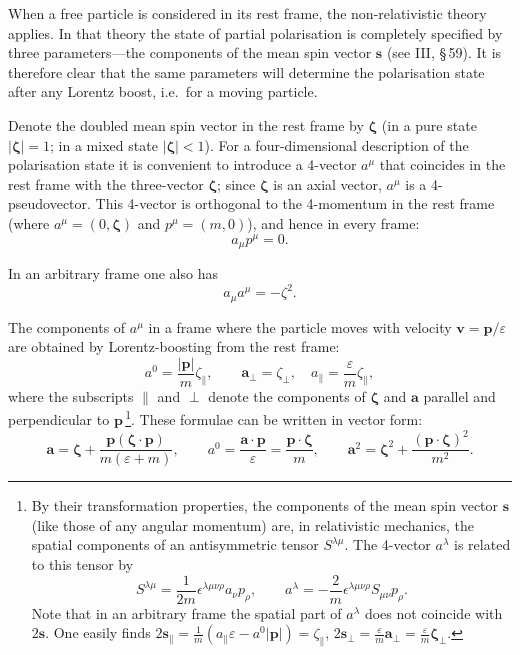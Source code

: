 When a free particle is considered in its rest frame, the non-relativistic theory applies. In that theory the state of partial polarisation is completely specified by three parameters---the components of the mean spin vector $\mathbf{s}$ (see III, \S\,59). It is therefore clear that the same parameters will determine the polarisation state after any Lorentz boost, i.e.\ for a moving particle.

Denote the doubled mean spin vector in the rest frame by $\boldsymbol{\zeta}$ (in a pure state $|\boldsymbol{\zeta}| = 1$; in a mixed state $|\boldsymbol{\zeta}| < 1$). For a four-dimensional description of the polarisation state it is convenient to introduce a 4-vector $a^\mu$ that coincides in the rest frame with the three-vector $\boldsymbol{\zeta}$; since $\boldsymbol{\zeta}$ is an axial vector, $a^\mu$ is a 4-pseudovector. This 4-vector is orthogonal to the 4-momentum in the rest frame (where $a^\mu = (0,\boldsymbol{\zeta})$ and $p^\mu = (m,0)$), and hence in every frame:
\begin{equation}
a_\mu p^\mu = 0.
\tag{29.6}
\end{equation}

In an arbitrary frame one also has
\begin{equation}
a_\mu a^\mu = -\zeta^2.
\tag{29.7}
\end{equation}

The components of $a^\mu$ in a frame where the particle moves with velocity $\mathbf{v} = \mathbf{p}/\varepsilon$ are obtained by Lorentz-boosting from the rest frame:
\begin{equation}
a^0 = \frac{|\mathbf{p}|}{m}\zeta_\|,\qquad \mathbf{a}_\perp = \zeta_\perp,\quad a_\| = \frac{\varepsilon}{m}\zeta_\|,
\tag{29.8}
\end{equation}
where the subscripts $\|$ and $\perp$ denote the components of $\boldsymbol{\zeta}$ and $\mathbf{a}$ parallel and perpendicular to $\mathbf{p}$\,\footnote{By their transformation properties, the components of the mean spin vector $\mathbf{s}$ (like those of any angular momentum) are, in relativistic mechanics, the spatial components of an antisymmetric tensor $S^{\lambda\mu}$. The 4-vector $a^\lambda$ is related to this tensor by
\[
S^{\lambda\mu} = \frac{1}{2m}\epsilon^{\lambda\mu\nu\rho}a_\nu p_\rho,\qquad a^\lambda = -\frac{2}{m}\epsilon^{\lambda\mu\nu\rho}S_{\mu\nu}p_\rho.
\]
Note that in an arbitrary frame the spatial part of $a^\lambda$ does not coincide with $2\mathbf{s}$. One easily finds
$2\mathbf{s}_\| = \frac{1}{m}(a_\|\varepsilon - a^0|\mathbf{p}|) = \zeta_\|$, $2\mathbf{s}_\perp = \frac{\varepsilon}{m}\mathbf{a}_\perp = \frac{\varepsilon}{m}\boldsymbol{\zeta}_\perp$.}. These formulae can be written in vector form:
\begin{equation}
\mathbf{a} = \boldsymbol{\zeta} + \frac{\mathbf{p}(\boldsymbol{\zeta}\cdot\mathbf{p})}{m(\varepsilon + m)},\qquad a^0 = \frac{\mathbf{a}\cdot\mathbf{p}}{\varepsilon} = \frac{\mathbf{p}\cdot\boldsymbol{\zeta}}{m},\qquad \mathbf{a}^2 = \boldsymbol{\zeta}^2 + \frac{(\mathbf{p}\cdot\boldsymbol{\zeta})^2}{m^2}.
\tag{29.9}
\end{equation}

